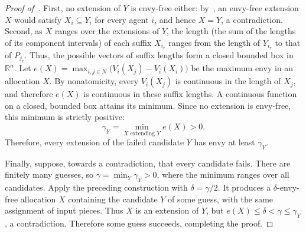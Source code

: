 \documentclass[11pt]{article}
\theoremstyle{plain}
\theoremstyle{definition}
\theoremstyle{plain}
\begin{document}
\begin{proof}[Proof of~]
First, no extension of $Y$ is envy-free either: by~, an envy-free extension $X$ would satisfy $X_i\subseteq Y_i$ for every agent $i$, and hence $X=Y$, a contradiction. Second, as $X$ ranges over the extensions of $Y$, the length (the sum of the lengths of its component intervals) of each suffix $X_{i_r}$ ranges from the length of $Y_{i_r}$ to that of $P_{j_r}$. Thus, the possible vectors of suffix lengths form a closed bounded box in $\mathbb R^n$. Let $e(X)=\max_{i,j\in N}\bigl(V_i(X_j)-V_i(X_i)\bigr)$ be the maximum envy in an allocation $X$. By nonatomicity, every $V_i(X_j)$ is continuous in the length of $X_j$, and therefore $e(X)$ is continuous in these suffix lengths. A continuous function on a closed, bounded box attains its minimum. Since no extension is envy-free, this minimum is strictly positive:
\[
\gamma_Y=\min_{X\text{ extending }Y}e(X)>0.
\]
Therefore, every extension of the failed candidate $Y$ has envy at least $\gamma_Y$.

Finally, suppose, towards a contradiction, that every candidate fails. There are finitely many guesses, so $\gamma=\min_Y\gamma_Y>0$, where the minimum ranges over all candidates. Apply the preceding construction with $\delta=\gamma/2$. It produces a $\delta$-envy-free allocation $X$ containing the candidate $Y$ of some guess, with the same assignment of input pieces. Thus $X$ is an extension of $Y$, but $e(X)\le\delta<\gamma\le\gamma_Y$,
a contradiction. Therefore some guess succeeds, completing the proof.
\end{proof}



\end{document}
